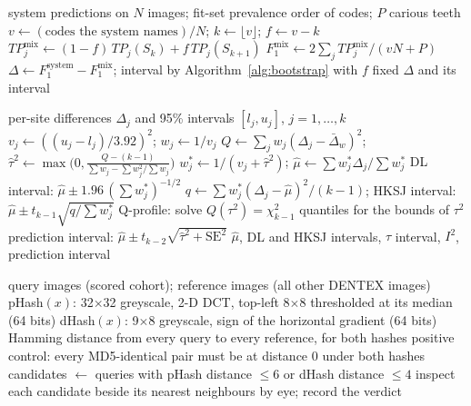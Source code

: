 \begin{algorithm}[!htbp]
\caption{Matched-volume image-blind comparison}
\label{alg:matched}
\begin{algorithmic}[1]
\Require system predictions on $N$ images; fit-set prevalence order of codes; $P$ carious teeth
\State $v \gets (\text{codes the system names}) / N$; $k \gets \lfloor v \rfloor$; $f \gets v - k$
  \State $\mathit{TP}^{\text{mix}}_j \gets (1-f)\,\mathit{TP}_j(S_k) + f\,\mathit{TP}_j(S_{k+1})$ 
\EndFor
\State $F_1^{\text{mix}} \gets 2\sum_j \mathit{TP}^{\text{mix}}_j / (vN + P)$
\State $\Delta \gets F_1^{\text{system}} - F_1^{\text{mix}}$; interval by Algorithm~\ref{alg:bootstrap} with $f$ fixed
\State \Return $\Delta$ and its interval
\end{algorithmic}
\end{algorithm}

\begin{algorithm}[!htbp]
\caption{Random-effects pooling across sites, with HKSJ and Q-profile intervals}
\label{alg:re}
\begin{algorithmic}[1]
\Require per-site differences $\Delta_j$ and 95\% intervals $[l_j, u_j]$, $j = 1,\dots,k$
\State $v_j \gets ((u_j - l_j)/3.92)^2$; $w_j \gets 1/v_j$
\State $Q \gets \sum_j w_j (\Delta_j - \bar\Delta_w)^2$; $\hat\tau^2 \gets \max\!\big(0, \frac{Q-(k-1)}{\sum w_j - \sum w_j^2/\sum w_j}\big)$ 
\State $w^{*}_j \gets 1/(v_j + \hat\tau^2)$; $\hat\mu \gets \sum w^{*}_j \Delta_j / \sum w^{*}_j$
\State DL interval: $\hat\mu \pm 1.96\,(\sum w^{*}_j)^{-1/2}$
\State $q \gets \sum w^{*}_j(\Delta_j - \hat\mu)^2/(k-1)$; HKSJ interval: $\hat\mu \pm t_{k-1}\sqrt{q/\sum w^{*}_j}$
\State Q-profile: solve $Q(\tau^2) = \chi^2_{k-1}$ quantiles for the bounds of $\tau^2$
\State prediction interval: $\hat\mu \pm t_{k-2}\sqrt{\hat\tau^2 + \text{SE}^2}$
\State \Return $\hat\mu$, DL and HKSJ intervals, $\tau$ interval, $I^2$, prediction interval
\end{algorithmic}
\end{algorithm}

\begin{algorithm}[!htbp]
\caption{Near-duplicate check (\texttt{dentex\_near\_duplicates.py})}
\label{alg:nearDup}
\begin{algorithmic}[1]
\Require query images (scored cohort); reference images (all other DENTEX images)
  \State pHash$(x)$: 32$\times$32 greyscale, 2-D DCT, top-left 8$\times$8 thresholded at its median (64 bits)
  \State dHash$(x)$: 9$\times$8 greyscale, sign of the horizontal gradient (64 bits)
\EndFor
\State Hamming distance from every query to every reference, for both hashes
\State positive control: every MD5-identical pair must be at distance 0 under both hashes
\State candidates $\gets$ queries with pHash distance $\leq 6$ or dHash distance $\leq 4$
\State inspect each candidate beside its nearest neighbours by eye; record the verdict
\end{algorithmic}
\end{algorithm}

